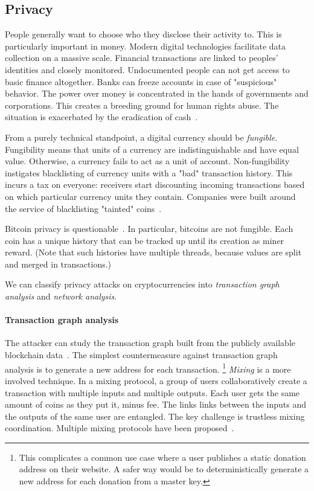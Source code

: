 \subsection{Privacy}

People generally want to choose who they disclose their activity to.
This is particularly important in money.
Modern digital technologies facilitate data collection on a massive scale.
Financial transactions are linked to peoples' identities and closely monitored.
Undocumented people can not get access to basic finance altogether.
Banks can freeze accounts in case of "suspicious" behavior.
The power over money is concentrated in the hands of governments and corporations.
This creates a breeding ground for human rights abuse.
The situation is exacerbated by the eradication of cash~\cite{Brito2019}.

From a purely technical standpoint, a digital currency should be \textit{fungible}.
Fungibility means that units of a currency are indistinguishable and have equal value.
Otherwise, a currency fails to act as a unit of account.
Non-fungibility instigates blacklisting of currency units with a "bad" transaction history.
This incurs a tax on everyone: receivers start discounting incoming transactions based on which particular currency units they contain.
Companies were built around the service of blacklisting "tainted" coins~\cite{Elliptic, Chainalysis}.

Bitcoin privacy is questionable~\cite{Reid2011,Androulaki2013}.
In particular, bitcoins are not fungible.
Each coin has a unique history that can be tracked up until its creation as miner reward.
(Note that such histories have multiple threads, because values are split and merged in transactions.)

We can classify privacy attacks on cryptocurrencies into \textit{transaction graph analysis} and \textit{network analysis}.

\paragraph{Transaction graph analysis}
The attacker can study the transaction graph built from the publicly available blockchain data~\cite{Meiklejohn2013, Ober2013, Ron2013}.
The simplest countermeasure against transaction graph analysis is to generate a new address for each transaction.
\footnote{This complicates a common use case where a user publishes a static donation address on their website. A safer way would be to deterministically generate a new address for each donation from a master key.}
\textit{Mixing} is a more involved technique.
In a mixing protocol, a group of users collaboratively create a transaction with multiple inputs and multiple outputs.
Each user gets the same amount of coins as they put it, minus fee.
The links links between the inputs and the outputs of the same user are entangled.
The key challenge is trustless mixing coordination.
Multiple mixing protocols have been proposed~\cite{Maxwell2013, Bonneau2014, Ruffing2014, Valenta2015}.

